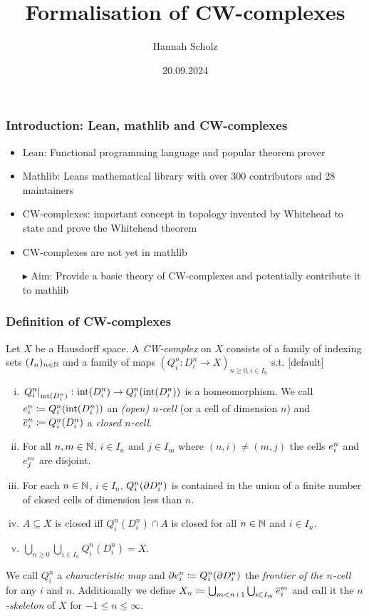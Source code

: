 \documentclass{beamer}
\title{Formalisation of CW-complexes}
\author{Hannah Scholz}
\institute[MI]{Mathematical Institute of the University of Bonn}
\date{20.09.2024}
\begin{document}
\frame{\titlepage}

\begin{frame}
\frametitle{Introduction: Lean, mathlib and CW-complexes}
\begin{itemize}
  \item Lean: Functional programming language and popular theorem prover
  \item Mathlib: Leans mathematical library with over 300 contributors and 28 maintainers
  \item CW-complexes: important concept in topology invented by Whitehead to state and prove the Whitehead theorem
  \item CW-complexes are not yet in mathlib 
  \item[$\blacktriangleright$] Aim: Provide a basic theory of CW-complexes and potentially contribute it to mathlib
\end{itemize}
\end{frame}

\begin{frame}
\frametitle{Definition of CW-complexes}
  Let $X$ be a Hausdorff space.
    A \emph{CW-complex} on $X$ consists of a family of indexing sets $(I_n)_{n \in \bN}$ and a family of maps $(Q_i^n\colon D_i^n\rightarrow X)_{n \ge 0, i \in I_n}$ s.t.
    [default]
    \begin{enumerate}[(i)]
        \item $\restrict{Q_i^n}{\interior{D_i^n}}\colon \interior{D_i^n} \rightarrow Q_i^n(\interior{D_i^n})$ is a homeomorphism. We call $\openCell{n}{i} \coloneq Q_i^n(\interior{D_i^n})$ an \emph{(open) $n$-cell} (or a cell of dimension $n$)
        and $\closedCell{n}{i} \coloneq Q_i^n(D_i^n)$ a \emph{closed $n$-cell}.
        \item For all $n, m \in \bN$, $i \in I_n$ and $j \in I_m$ where $(n, i) \ne (m, j)$ the cells $\openCell{n}{i}$ and $\openCell{m}{j}$ are disjoint.
        \item For each $n \in \bN$, $i \in I_n$, $Q_i^n(\boundary D_i^n)$ is contained in the union of a finite number of closed cells of dimension less than $n$.
        \item $A \subseteq X$ is closed iff $Q_i^n(D_i^n) \cap A$ is closed for all $n \in \bN$ and $i \in I_n$.
        \item $\bigcup_{n \ge 0}\bigcup_{i \in I_n} Q_i^n(D_i^n) = X$.
    \end{enumerate}
    We call $Q_i^n$ a \emph{characteristic map} and $\cellFrontier{n}{i} \coloneq Q_i^n(\boundary D_i^n)$ the \emph{frontier of the $n$-cell} for any $i$ and $n$.
    Additionally we define $X_n \coloneq \bigcup_{m < n + 1} \bigcup_{i \in I_m} \closedCell{m}{i}$ and call it the \emph{$n$-skeleton} of $X$ for $-1 \le n \le \infty$.
\end{frame}
\end{document}
